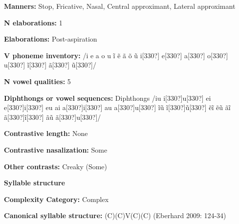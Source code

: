 \begin{styleBody}
\textbf{Manners:} Stop, Fricative, Nasal, Central approximant, Lateral approximant
\end{styleBody}

\begin{styleBody}
\textbf{N elaborations:} 1
\end{styleBody}

\begin{styleBody}
\textbf{Elaborations:} Post-aspiration
\end{styleBody}

\begin{styleBody}
\textbf{V phoneme inventory:} /i e a o u \~{i} \~{e} \~{a} \~{o} \~{u} i[330?] e[330?] a[330?] o[330?] u[330?] \~{i}[330?] \~{a}[330?] \~{u}[330?]/
\end{styleBody}

\begin{styleBody}
\textbf{N vowel qualities:} 5
\end{styleBody}

\begin{styleBody}
\textbf{Diphthongs or vowel sequences:} Diphthongs /iu i[330?]u[330?] ei e[330?]i[330?] eu ai a[330?]i[330?] au a[330?]u[330?] \~{i}\~{u} \~{i}[330?]\~{u}[330?] \~{e}\~{i} \~{e}\~{u} \~{a}\~{i} \~{a}[330?]\~{i}[330?] \~{a}\~{u} \~{a}[330?]u[330?]/
\end{styleBody}

\begin{styleBody}
\textbf{Contrastive length:} None
\end{styleBody}

\begin{styleBody}
\textbf{Contrastive nasalization:} Some
\end{styleBody}

\begin{styleBody}
\textbf{Other contrasts:} Creaky (Some)
\end{styleBody}

\begin{styleBody}
\textbf{Syllable structure}
\end{styleBody}

\begin{styleBody}
\textbf{Complexity Category:} Complex
\end{styleBody}

\begin{styleBody}
\textbf{Canonical syllable structure:} (C)(C)V(C)(C)\textbf{ }(Eberhard 2009: 124-34)
\end{styleBody}

